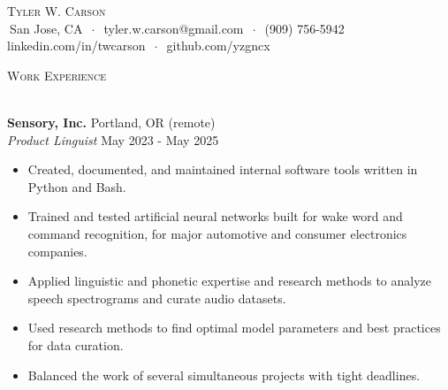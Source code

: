 \documentclass[]{article}
\newcommand{\lineunder} {
	\vspace*{-8pt} \\
	\hspace*{-18pt} \hrulefill \\
}
\newcommand{\header} [1] {
	{\hspace*{-18pt}\vspace*{6pt} \textsc{#1}}
	\vspace*{-6pt} \lineunder
}
\begin{document}
	\vspace*{-40pt}
	
	
	\vspace*{-10pt}
	\begin{center}
		{\Huge \scshape {Tyler W. Carson}}\\
		$\ $San Jose, CA $\ \cdot\ $ tyler.w.carson@gmail.com $\ \cdot\ $ (909) 756-5942\\ linkedin.com/in/twcarson $\ \cdot\ $ github.com/yzgncx\\
	\end{center}
	
	
	\header{Work Experience}
	\vspace{1mm}
	
	\textbf{Sensory, Inc.} \hfill Portland, OR (remote)\\
	\textit{Product Linguist} \hfill May 2023 - May 2025\\
	\vspace{-3mm}
	\begin{itemize} \itemsep 0pt
		\item Created, documented, and maintained internal software tools written in Python and Bash.
		\item Trained and tested artificial neural networks built for wake word and command recognition, for major automotive and consumer electronics companies.
		\item Applied linguistic and phonetic expertise and research methods to analyze speech spectrograms and curate audio datasets.
		\item Used research methods to find optimal model parameters and best practices for data curation.
		\item Balanced the work of several simultaneous projects with tight deadlines.
	\end{itemize}
	
\end{document}
